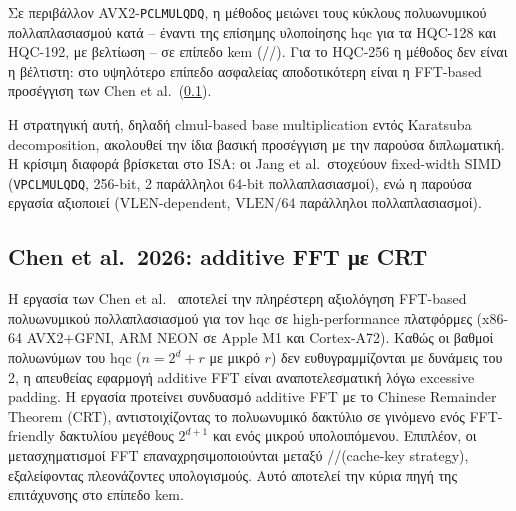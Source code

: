 Σε περιβάλλον AVX2-\texttt{PCLMULQDQ}, η μέθοδος μειώνει τους κύκλους
πολυωνυμικού πολλαπλασιασμού κατά – έναντι της επίσημης
υλοποίησης \gls{hqc} για τα HQC-128 και HQC-192, με βελτίωση – σε
επίπεδο \gls{kem} (\KeyGen/\Encaps/\Decaps). Για το HQC-256 η μέθοδος δεν 
είναι η βέλτιστη: στο υψηλότερο επίπεδο ασφαλείας αποδοτικότερη είναι 
η FFT-based προσέγγιση των Chen et al.\ (\cref{ssec:rw-chen-fft}).

Η στρατηγική αυτή, δηλαδή clmul-based base multiplication εντός Karatsuba 
decomposition, ακολουθεί την ίδια βασική προσέγγιση με την παρούσα διπλωματική. 
Η κρίσιμη διαφορά βρίσκεται στο ISA: οι Jang et al.\ στοχεύουν 
fixed-width SIMD (\texttt{VPCLMULQDQ}, 256-bit, 2 παράλληλοι 64-bit 
πολλαπλασιασμοί), ενώ η παρούσα εργασία αξιοποιεί \vclmul 
(VLEN-dependent, $\text{VLEN}/64$ παράλληλοι πολλαπλασιασμοί).

\subsection{Chen et al.\ 2026: additive FFT με CRT}
\label{ssec:rw-chen-fft}

Η εργασία των Chen et al.~\cite{Chen2026-TCHES-HQC-FFT} αποτελεί
την πληρέστερη αξιολόγηση FFT-based πολυωνυμικού πολλαπλασιασμού για τον
\gls{hqc} σε high-performance πλατφόρμες (x86-64 AVX2+GFNI, ARM NEON σε Apple M1
και Cortex-A72). Καθώς οι βαθμοί πολυωνύμων του \gls{hqc} ($n = 2^d + r$ με μικρό
$r$) δεν ευθυγραμμίζονται με δυνάμεις του 2, η απευθείας εφαρμογή additive FFT
είναι αναποτελεσματική λόγω excessive padding. Η εργασία προτείνει συνδυασμό
additive FFT με το Chinese Remainder Theorem (CRT), αντιστοιχίζοντας το
πολυωνυμικό δακτύλιο σε γινόμενο ενός FFT-friendly δακτυλίου μεγέθους $2^{d+1}$
και ενός μικρού υπολοιπόμενου. Επιπλέον, οι μετασχηματισμοί FFT επαναχρησιμοποιούνται
μεταξύ \KeyGen/\Encaps/\Decaps (cache-key strategy), εξαλείφοντας 
πλεονάζοντες υπολογισμούς. Αυτό αποτελεί την κύρια πηγή της επιτάχυνσης 
στο επίπεδο \gls{kem}.

